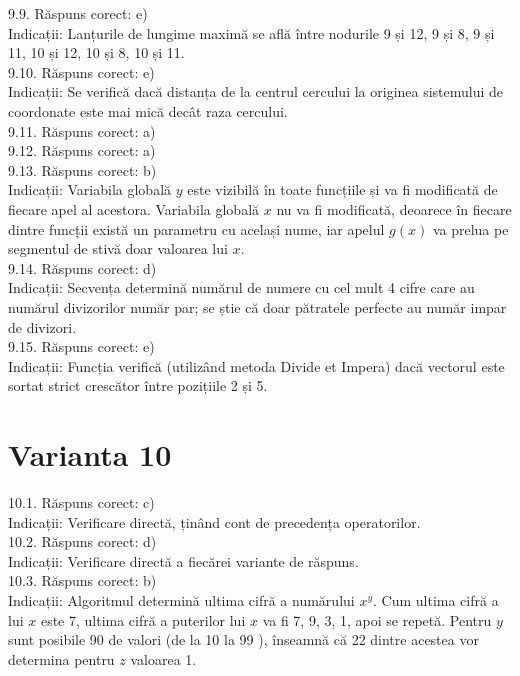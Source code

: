 9.9. Răspuns corect: e)\\
Indicații: Lanțurile de lungime maximă se află între nodurile 9 și 12, 9 și 8, 9 și 11, 10 și 12, 10 și 8, 10 și 11.\\

9.10. Răspuns corect: e)\\
Indicații: Se verifică dacă distanța de la centrul cercului la originea sistemului de coordonate este mai mică decât raza cercului.\\

9.11. Răspuns corect: a)\\

9.12. Răspuns corect: a)\\

9.13. Răspuns corect: b)\\
Indicații: Variabila globală $y$ este vizibilă în toate funcțiile și va fi modificată de fiecare apel al acestora. Variabila globală $x$ nu va fi modificată, deoarece în fiecare dintre funcț̦ii există un parametru cu același nume, iar apelul $g(x)$ va prelua pe segmentul de stivă doar valoarea lui $x$.\\

9.14. Răspuns corect: d)\\
Indicații: Secvența determină numărul de numere cu cel mult 4 cifre care au numărul divizorilor număr par; se știe că doar pătratele perfecte au număr impar de divizori.\\

9.15. Răspuns corect: e)\\
Indicații: Funcția verifică (utilizând metoda Divide et Impera) dacă vectorul este sortat strict crescător între pozițiile 2 și 5.\\

\section*{Varianta 10}

10.1. Răspuns corect: c)\\
Indicații: Verificare directă, ținând cont de precedența operatorilor.\\

10.2. Răspuns corect: d)\\
Indicații: Verificare directă a fiecărei variante de răspuns.\\

10.3. Răspuns corect: b)\\
Indicații: Algoritmul determină ultima cifră a numărului $x^{y}$. Cum ultima cifră a lui $x$ este 7, ultima cifră a puterilor lui $x$ va fi 7, 9, 3, 1, apoi se repetă. Pentru $y$ sunt posibile 90 de valori (de la 10 la 99 ), înseamnă că 22 dintre acestea vor determina pentru $z$ valoarea 1.\\

